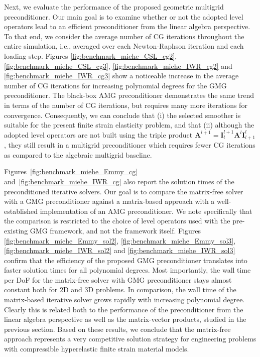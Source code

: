 \documentclass[AMA,STIX1COL]{WileyNJD-v2}
\newcommand*{\gz}[1]{\boldsymbol{#1}}
\begin{document}
Next, we evaluate the performance of the proposed geometric multigrid preconditioner.
Our main goal is to examine whether or not the adopted level operators lead to an efficient preconditioner from the linear algebra perspective. To that end,
we consider the average number of CG iterations throughout the entire simulation, i.e., averaged over each Newton-Raphson iteration and each loading step.
Figures \ref{fig:benchmark_miehe_CSL_cg2}, \ref{fig:benchmark_miehe_CSL_cg3}, \ref{fig:benchmark_miehe_IWR_cg2} and \ref{fig:benchmark_miehe_IWR_cg3} show a
 noticeable increase in the average number of CG iterations for increasing polynomial degrees
 for the GMG preconditioner.
The black-box AMG preconditioner
demonstrates the same trend in terms of the number of CG iterations, but
requires many more iterations for convergence.
Consequently, we can conclude that (i) the selected smoother is suitable for the present finite strain elasticity problem, and that (ii) although the adopted level operators are not built using the triple product $\gz A^{l+1}=\gz I^{l+1}_{l} \gz A^l \gz I^l_{l+1}$, they still result in a multigrid preconditioner which requires fewer CG iterations as compared to the algebraic multigrid baseline.

Figures~\ref{fig:benchmark_miehe_Emmy_cg} and~\ref{fig:benchmark_miehe_IWR_cg} also report the solution times of the preconditioned iterative solvers.
Our goal is to compare the matrix-free solver with a GMG preconditioner against a matrix-based approach with a well-established implementation of an AMG preconditioner.
We note specifically that the comparison is restricted to the choice of level operators used with the pre-existing GMG framework, and not the framework itself.
Figures \ref{fig:benchmark_miehe_Emmy_sol2}, \ref{fig:benchmark_miehe_Emmy_sol3}, \ref{fig:benchmark_miehe_IWR_sol2} and \ref{fig:benchmark_miehe_IWR_sol3} confirm that the efficiency of the proposed GMG preconditioner translates into faster solution times for all polynomial degrees.
Most importantly, the wall time per DoF for the matrix-free solver with GMG preconditioner stays almost constant both for 2D and 3D problems.
In comparison, the wall time of the matrix-based iterative solver grows rapidly with increasing polynomial degree.
Clearly this is related both to the performance of the preconditioner from the linear algebra perspective as well as the matrix-vector products, studied in the previous section.
Based on these results, we conclude that the matrix-free approach represents a very competitive solution strategy for engineering problems
with compressible hyperelastic finite strain material models.
\end{document}
